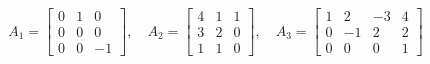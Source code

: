 \begin{question}{3} %
\begin{equation}
A_1 =
\begin{bmatrix}
     0 & 1 &  0 \\
     0 & 0 &  0 \\
     0 & 0 & -1
\end{bmatrix}, \quad
A_2 =
\begin{bmatrix}
     4 & 1 & 1 \\
     3 & 2 & 0 \\
     1 & 1 & 0
\end{bmatrix}, \quad
A_3 =
\begin{bmatrix}
    1 &  2 & -3 & 4 \\
    0 & -1 &  2 & 2 \\
    0 &  0 &  0 & 1
\end{bmatrix}  \nonumber
\end{equation}
\end{question}
